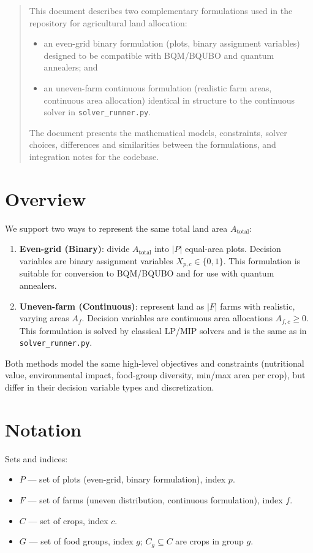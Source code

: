 \documentclass[11pt,a4paper]{article}
\author{Generated from codebase analysis}
\date{\today}
\begin{document}
\maketitle

\begin{abstract}
This document describes two complementary formulations used in the repository for agricultural land allocation:
\begin{itemize}
    \item an even-grid binary formulation (plots, binary assignment variables) designed to be compatible with BQM/BQUBO and quantum annealers; and
    \item an uneven-farm continuous formulation (realistic farm areas, continuous area allocation) identical in structure to the continuous solver in \texttt{solver\_runner.py}.
\end{itemize}
The document presents the mathematical models, constraints, solver choices, differences and similarities between the formulations, and integration notes for the codebase.
\end{abstract}

\section{Overview}

We support two ways to represent the same total land area $A_{\text{total}}$:
\begin{enumerate}
    \item \textbf{Even-grid (Binary)}: divide $A_{\text{total}}$ into $|P|$ equal-area plots. Decision variables are binary assignment variables $X_{p,c} \in \{0,1\}$. This formulation is suitable for conversion to BQM/BQUBO and for use with quantum annealers.
    \item \textbf{Uneven-farm (Continuous)}: represent land as $|F|$ farms with realistic, varying areas $A_f$. Decision variables are continuous area allocations $A_{f,c} \ge 0$. This formulation is solved by classical LP/MIP solvers and is the same as in \texttt{solver\_runner.py}.
\end{enumerate}

Both methods model the same high-level objectives and constraints (nutritional value, environmental impact, food-group diversity, min/max area per crop), but differ in their decision variable types and discretization.

\section{Notation}
Sets and indices:
\begin{itemize}
    \item $P$ — set of plots (even-grid, binary formulation), index $p$.
    \item $F$ — set of farms (uneven distribution, continuous formulation), index $f$.
    \item $C$ — set of crops, index $c$.
    \item $G$ — set of food groups, index $g$; $C_g \subseteq C$ are crops in group $g$.
\end{itemize}
\end{document}

